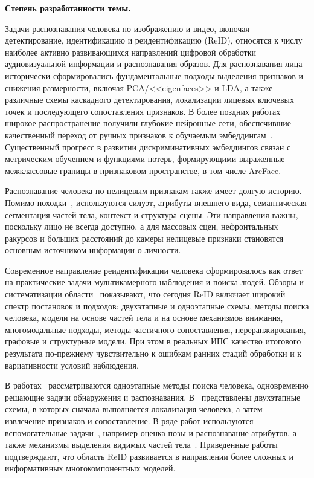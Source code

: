 \textbf{Степень разработанности темы.}

Задачи распознавания человека по изображению и видео, включая детектирование,
идентификацию и реидентификацию (ReID), относятся к числу наиболее активно
развивающихся направлений цифровой обработки аудиовизуальной информации и
распознавания образов. Для распознавания лица исторически сформировались
фундаментальные подходы выделения признаков и снижения размерности, включая
PCA/<<eigenfaces>> и LDA, а также различные схемы каскадного детектирования,
локализации лицевых ключевых точек и последующего сопоставления признаков.
В более поздних работах широкое распространение получили глубокие нейронные
сети, обеспечившие качественный переход от ручных признаков к обучаемым
эмбеддингам~\cite{Shanmugavadivu2016facedetect,Hofer2021faceparts,He2020crossspectral,Li2006nirface,Zhang2004infofusion,CLiu2014face,Zhao2011facecorner,Dang2017facedetection,Tian2012faceJPEG,Nehru2017violajones}. Существенный прогресс
в развитии дискриминативных эмбеддингов связан с метрическим обучением
и функциями потерь, формирующими выраженные межклассовые границы
в признаковом пространстве, в том числе ArcFace.

Распознавание человека по нелицевым признакам также имеет долгую историю.
Помимо походки~\cite{Cutler2000periodicmotion,Heisele1998pedestrian,Nixon1999gait}, используются силуэт, атрибуты внешнего вида,
семантическая сегментация частей тела, контекст и структура сцены. Эти
направления важны, поскольку лицо не всегда доступно, а для массовых сцен,
нефронтальных ракурсов и больших расстояний до камеры нелицевые признаки
становятся основным источником информации о личности.

Современное направление реидентификации человека сформировалось как ответ
на практические задачи мультикамерного наблюдения и поиска людей. Обзоры
и систематизации области~\cite{BedagkarGala2014survey,Wu2019reidsurvey,Zheng2016reidsurvey,Vezzani2013reidsurvey,Wang2020reidoverview,Yadav2023reidsurvey,Ye2021reidsurvey} показывают, что сегодня
ReID включает широкий спектр постановок и подходов: двухэтапные и одноэтапные
схемы, методы поиска человека, модели на основе частей тела и на основе механизмов внимания,
многомодальные подходы, методы частичного сопоставления, переранжирования, графовые и
структурные модели. При этом в реальных ИПС качество итогового результата
по‑прежнему чувствительно к ошибкам ранних стадий обработки и к вариативности
условий наблюдения.

В работах~\cite{Chang2018rcaa,Chen2020hierarchical,Chen2020normaware} рассматриваются одноэтапные методы поиска человека,
одновременно решающие задачи обнаружения и распознавания. В~\cite{Chen2020personsearch,Dong2020personsearch,Han2019reidlocalization}
представлены двухэтапные схемы, в которых сначала выполняется локализация
человека, а затем --- извлечение признаков и сопоставление. В ряде работ
используются вспомогательные задачи~\cite{Chen2020personsearch,Chen2022keypoint}, например оценка позы и распознавание
атрибутов, а также механизмы выделения видимых частей тела~\cite{Zhong2020personsearch}. Приведенные работы
подтверждают, что область ReID развивается в направлении более сложных и информативных
многокомпонентных моделей.

